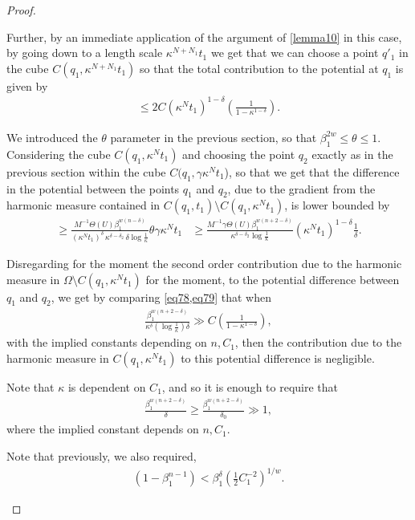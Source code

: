 \documentclass{article}
\newcounter{lem}
\theoremstyle{plain}
\theoremstyle{plain}
\newcommand{\thee}{\Theta(U)}
\theoremstyle{definition}
\theoremstyle{plain}
\begin{document}
\begin{proof}
\begin{itemize}
Further, by an immediate application of the argument of  \cref{lemma10} in this case, by going down to a length scale $\kappa^{N+N_1} t_1$ we get that we can choose a point \(q'_1\) in the cube \(C(q_1,\kappa^{N+N_1} t_1)\) so that the total contribution
to the potential at $q_1$ is given by
\begin{align}\label{eq78}
\le 2C (\kappa^N t_1)^{1-\delta}
\left( \frac{1}{1-\kappa^{1-\delta}} \right).
\end{align}

We introduced the \(\theta\) parameter in the previous section, so that \(\beta_1^{2w}\le \theta \le 1\). Considering the cube \(C(q_1,\kappa^N t_1)\) and choosing the point
\(q_2\) exactly as in the previous section within the cube $C(q_1,\gamma\kappa^{N}t_1$), so that we get that the difference in the potential between the points
\(q_1\) and \(q_2\), due to the gradient from the harmonic measure contained in \(C(q_1,t_1)\setminus C(q_1,\kappa^N t_1)\),
is lower bounded by
\begin{align}\label{eq79}
\geq \frac{M^{-1}\thee\beta_1^{w (n-\delta)}}{(\kappa^N t_1)^{\delta}\,
\kappa^{\delta-\delta_2}\,\delta \log \frac{1}{\kappa}} \theta\gamma\kappa^N t_1
&\geq
\frac{M^{-1}\gamma\thee\beta_1^{w(n+2-\delta)}}{\kappa^{\delta-\delta_2 }\log \frac{1}{\kappa}}
(\kappa^N t_1)^{1-\delta}\frac{1}{\delta}.
\end{align}

Disregarding for the moment the second order contribution due to the harmonic measure in
\(\Omega\setminus C(q_1,\kappa^N t_1)\) for the moment, to the potential difference between
\(q_1\) and \(q_2\), we get by comparing \cref{eq78,eq79} that when
\begin{align}
\frac{\beta_1^{w(n+2-\delta)}}{\kappa^\delta (\log \tfrac{1}{\kappa}) \delta}
\gg
C\left(\frac{1}{1-\kappa^{1-\delta}}\right),
\end{align}
with the implied constants depending on $n,C_1$, then the contribution due to the harmonic measure in \(C(q_1,\kappa^N t_1)\) to this potential difference
is negligible.

Note that \(\kappa\) is dependent on \(C_1\), and so it is enough to require that
\begin{align}
\frac{\beta_1^{w(n+2-\delta)}}{\delta}\geq \frac{\beta_1^{w(n+2-\delta)}}{\delta_0}  \gg 1,
\end{align}
where the implied constant depends on $n,C_1$.

Note that previously, we also required,
\begin{align}\label{eq82}
(1-\beta_1^{n-1}) < \beta_1^\delta \left(\frac{1}{2}C_{1}^{-2}\right)^{1/w}.
\end{align}


\end{itemize}
\end{proof}
\end{document}
